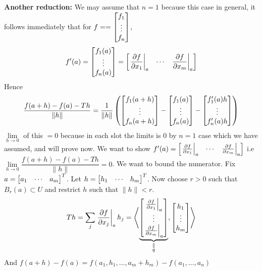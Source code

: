\begin{myproof}
	\textbf{Another reduction: }We may assume that $n=1$ because this case in general, it follows immediately  that for $f==\left[ \begin{matrix}
				f_1 \\ \vdots\\ f_n
			\end{matrix} \right]$, $$f'(a)=\left[ \begin{matrix}
				f_1(a) \\ \vdots\\ f_n(a)
			\end{matrix} \right]=\left[ \begin{matrix}
				\left.\dfrac{\partial f}{\partial x_1}\right|_a & \cdots & \left.\dfrac{\partial f}{\partial x_m}\right|_a
			\end{matrix} \right]$$Hence $$\dfrac{f(a+h)-f(a)-Th}{\|h\|}=\frac1{\|h\|}\left( \left[ \begin{matrix}
				f_1(a+h) \\ \vdots\\ f_n(a+h)
			\end{matrix} \right]-\left[ \begin{matrix}
				f_1(a) \\ \vdots\\ f_n(a)
			\end{matrix} \right]-\left[ \begin{matrix}
				f_1'(a)h \\ \vdots\\ f_n'(a)h
			\end{matrix} \right] \right)$$$\lim\limits_{h\to 0}$ of this $= 0$ because in each slot the limits is 0 by $n=1$ case which we have assumed, and will prove now.
			\vspace*{2mm}
			We want to show $f'(a)=\left[\begin{matrix}
				\left.\frac{\partial f}{\partial x_1}\right|_a & \cdots & \left.\frac{\partial f}{\partial x_m}\right|_a
			\end{matrix} \right]$ i.e $\lim\limits_{h\to 0}\dfrac{f(a+h)-f(a)-Th}{\|h\|}=0$. We want to bound the numerator. Fix $a=\left[ \begin{matrix}
				a_1 & \cdots & a_m
			\end{matrix} \right]^T$. Let $h=\left[ \begin{matrix}
				h_1 & \cdots & h_m
			\end{matrix} \right]^T$. Now choose $r>0$ such that $B_r(a)\subset U$ and restrict $h$ such that $\|h\|<r$. \[ Th=\sum_j\left.\dfrac{\partial f}{\partial x_j}\right|_ah_j = \left\langle \underbrace{\left[\begin{matrix}
					\left.\frac{\partial f}{\partial x_1}\right|_a \\ \vdots \\ \left.\frac{\partial f}{\partial x_m}\right|_a
				\end{matrix} \right]}_{\substack{\parallel \\ q}}, \left[ \begin{matrix}
				h_1 \\ \vdots \\ h_m
			\end{matrix} \right] \right\rangle \]And $f(a+h)-f(a)=f(a_1,h_1,\dots, a_m+h_m)-f(a_1,\dots, a_n)$


\end{myproof}
